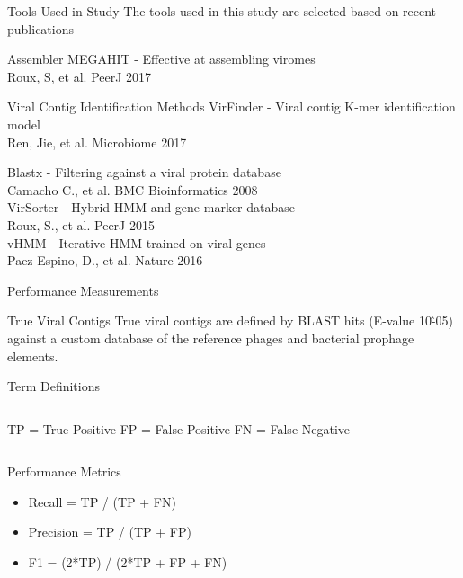 \documentclass[11pt]{beamer}
\begin{document}
	\begin{frame}{Tools Used in Study}
	The tools used in this study are selected based on recent publications
	\begin{block}{Assembler}
	MEGAHIT - Effective at assembling viromes \\
	\tiny{Roux, S, et al. PeerJ 2017}
	\end{block}
	
	\begin{block}{Viral Contig Identification Methods}
	VirFinder - Viral contig K-mer identification model \\ 
	\tiny{Ren, Jie, et al. Microbiome 2017}
	
	\large{Blastx - Filtering against a viral protein database} \\
	\tiny{Camacho C., et al. BMC Bioinformatics 2008} \\
	
	\large{VirSorter - Hybrid HMM and gene marker database} \\
	\tiny{Roux, S., et al. PeerJ 2015} \\
	
	\large{vHMM - Iterative HMM trained on viral genes} \\
	\tiny{Paez-Espino, D., et al. Nature 2016} 
	
	\end{block}
	
	
	\end{frame}
	
	
	
	
	\begin{frame}{Performance Measurements}
	
	\begin{block}{True Viral Contigs}
	True viral contigs are defined by BLAST hits (E-value 10\^-05) against a custom database of the reference phages and bacterial prophage elements. 
	\end{block}
	
	\begin{block}{Term Definitions}
	\begin{columns}
	TP = True Positive
	FP = False Positive
	FN = False Negative
	\end{columns}
	
	\end{block}
	\vspace{-0.2cm}
	\begin{block}{Performance Metrics}
	\begin{itemize}
	\item Recall = TP / (TP + FN)
	\item Precision = TP / (TP + FP)
	\item F1 = (2*TP) / (2*TP + FP + FN)
	\end{itemize}
	\end{block}
	\end{frame}
	
\end{document}

